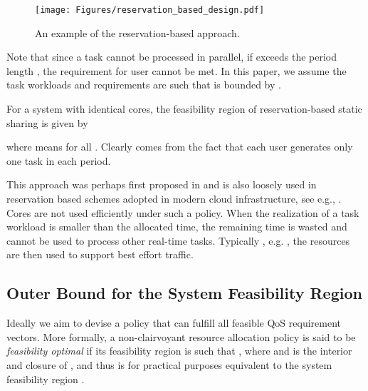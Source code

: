 \documentclass[prodmode,acmtompecs]{acmsmall}
\newcommand{\myComments}[1]{}
\newif\ifdissertation
\newcommand{\dissertationStart}{\ifdissertation  \myComments{Dissertation version: }}
\newcommand{\commentEnd}{\myComments{End}}
\begin{document}
\begin{figure}[htp]
  \centering
  \texttt{[image: Figures/reservation\_based\_design.pdf]}
  \caption{An example of the reservation-based approach. }
  \label{fig_reservation_based_design}
\end{figure}

Note that since a task cannot be processed in parallel, if  exceeds the period length , the requirement for user  cannot be met. In this paper, we assume the task workloads and requirements  are such that  is bounded by . 

For a system with  identical cores, the feasibility region  of reservation-based static sharing is given by

where  means  for all . 
Clearly  comes from the fact that each user generates only one task in each period. 

This approach was perhaps first proposed in \cite{AtB98A} and is also loosely used in reservation based schemes adopted in modern cloud infrastructure, see e.g., \cite{VPK15A}. 
Cores are not used efficiently under such a policy. When the realization of a task workload is smaller than the allocated time, the remaining time is wasted and cannot be used to process other real-time tasks. 
Typically , e.g. \cite{VPK15A}, the resources are then used to support best effort traffic. 

\subsection{Outer Bound for the System Feasibility Region }
\label{subsection_outer_bound_for_F}
Ideally we aim to devise a policy that can fulfill all feasible QoS requirement vectors. More formally, a non-clairvoyant resource allocation policy  is said to be {\em feasibility optimal} if its feasibility region  is such that , where  and  is the interior and closure of , and thus is for practical purposes equivalent to the system feasibility region . 

\dissertationStart
Ideally we wish to devise a policy that can fulfill all feasible QoS requirement vectors. More formally, a non-clairvoyant resource allocation policy  is said to be {\em feasibility optimal} if its feasibility region  is such that , where  and  is the interior and closure of . In other words, a policy  is feasibility optimal if  is different from the feasibility region  by at most a boundary, and therefore, is equivalent to  for practical purposes. 
\commentEnd\fi
\end{document}
